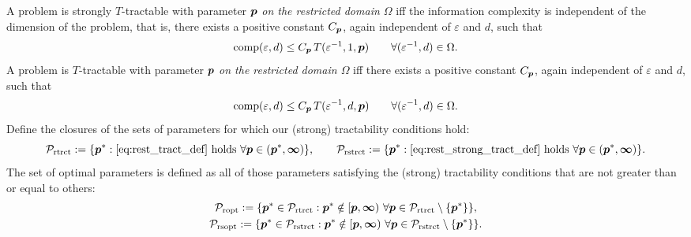 \documentclass[sort&compress]{elsarticle}
\newcommand{\peter}[1]{\begingroup\color{violet}#1\endgroup}
\begin{document}
\begin{definition}
    A problem is strongly
$T$-tractable with parameter $\boldsymbol{p}$ \emph{on the restricted domain $\Omega$} iff the information complexity is independent of the dimension of the problem, that is, there exists a positive constant $C_{\boldsymbol{p}}$, again independent of $\varepsilon$ and $d$, such that
\begin{equation} \label{eq:rest_strong_tract_def}
	\operatorname{comp}(\varepsilon,d) \le C_{\boldsymbol{p}}\, T(\varepsilon^{-1},1,\boldsymbol{p}) \qquad \forall(\varepsilon^{-1},d) \in \Omega.
\end{equation}
A problem is
$T$-tractable with parameter $\boldsymbol{p}$ \emph{on the restricted domain $\Omega$} iff there exists a positive constant $C_{\boldsymbol{p}}$, again independent of $\varepsilon$ and $d$, such that
\begin{equation} \label{eq:rest_tract_def}
	\operatorname{comp}(\varepsilon,d) \le C_{\boldsymbol{p}}\, T(\varepsilon^{-1},d,\boldsymbol{p}) \qquad \forall(\varepsilon^{-1},d) \in \Omega.
\end{equation}
 Define the closures of the sets of parameters for which our (strong) tractability conditions hold:
\begin{equation*}
	\mathcal{P}_{\textup{rtrct}} : = \{\boldsymbol{p}^* : \eqref{eq:rest_tract_def} \text{ holds }\forall \boldsymbol{p} \in (\boldsymbol{p}^*,\boldsymbol{\infty})\}, \qquad
	\mathcal{P}_{\textup{rstrct}} : = \{\boldsymbol{p}^* : \eqref{eq:rest_strong_tract_def} \text{ holds }\forall \boldsymbol{p} \in (\boldsymbol{p}^*,\boldsymbol{\infty})\}.
\end{equation*}
    The  set of optimal parameters is defined as all of those parameters satisfying the (strong) tractability conditions that are not greater than or equal to others:
\begin{gather}
	\mathcal{P}_{\textup{ropt}} : = \{\boldsymbol{p}^* \in \mathcal{P}_{\textup{rtrct}} :  \boldsymbol{p}^* \notin [\boldsymbol{p},\boldsymbol{\infty}) \ \forall \boldsymbol{p} \in  \mathcal{P}_{\textup{rtrct}} \setminus \{\boldsymbol{p}^*\} \}, \\
	\mathcal{P}_{\textup{rsopt}} : = \{\boldsymbol{p}^* \in \mathcal{P}_{\textup{rstrct}} :  \boldsymbol{p}^* \notin [\boldsymbol{p},\boldsymbol{\infty}) \ \forall \boldsymbol{p} \in  \mathcal{P}_{\textup{rstrct}} \setminus \{\boldsymbol{p}^*\} \}.
\end{gather}
\end{definition}
\end{document}
